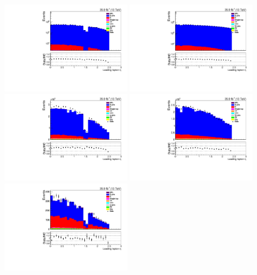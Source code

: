 \begin{figure}[h]
\centering
\includegraphics[width=0.49\textwidth]{figs/background-estimation/plots/unblinded/prompt_ee_ttbarInc/lep1Eta_NPL_ee_lepSel_ee_log.pdf}
\includegraphics[width=0.49\textwidth]{figs/background-estimation/plots/unblinded/prompt_mumu_ttbarInc/lep1Eta_NPL_mumu_lepSel_mumu_log.pdf}
\\
\includegraphics[width=0.49\textwidth]{figs/background-estimation/plots/unblinded/prompt_ee_ttbarInc/lep1Eta_NPL_ee_jetSel_ee.pdf}
\includegraphics[width=0.49\textwidth]{figs/background-estimation/plots/unblinded/prompt_mumu_ttbarInc/lep1Eta_NPL_mumu_jetSel_mumu.pdf}
\\
\includegraphics[width=0.49\textwidth]{figs/background-estimation/plots/unblinded/prompt_ee_ttbarInc/lep1Eta_NPL_ee_wMass_ee.pdf}

\end{figure}
